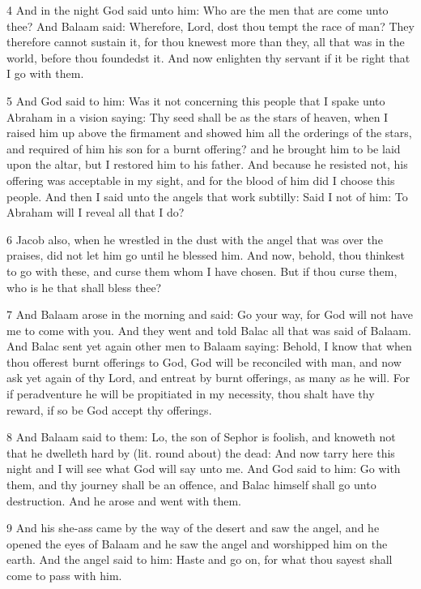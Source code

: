 \par 4 And in the night God said unto him: Who are the men that are come unto thee? And Balaam said: Wherefore, Lord, dost thou tempt the race of man? They therefore cannot sustain it, for thou knewest more than they, all that was in the world, before thou foundedst it. And now enlighten thy servant if it be right that I go with them. 

\par 5 And God said to him: Was it not concerning this people that I spake unto Abraham in a vision saying: Thy seed shall be as the stars of heaven, when I raised him up above the firmament and showed him all the orderings of the stars, and required of him his son for a burnt offering? and he brought him to be laid upon the altar, but I restored him to his father. And because he resisted not, his offering was acceptable in my sight, and for the blood of him did I choose this people. And then I said unto the angels that work subtilly: Said I not of him: To Abraham will I reveal all that I do?

\par 6 Jacob also, when he wrestled in the dust with the angel that was over the praises, did not let him go until he blessed him. And now, behold, thou thinkest to go with these, and curse them whom I have chosen. But if thou curse them, who is he that shall bless thee? 

\par 7 And Balaam arose in the morning and said: Go your way, for God will not have me to come with you. And they went and told Balac all that was said of Balaam. And Balac sent yet again other men to Balaam saying: Behold, I know that when thou offerest burnt offerings to God, God will be reconciled with man, and now ask yet again of thy Lord, and entreat by burnt offerings, as many as he will. For if peradventure he will be propitiated in my necessity, thou shalt have thy reward, if so be God accept thy offerings. 

\par 8 And Balaam said to them: Lo, the son of Sephor is foolish, and knoweth not that he dwelleth hard by (lit. round about) the dead: And now tarry here this night and I will see what God will say unto me. And God said to him: Go with them, and thy journey shall be an offence, and Balac himself shall go unto destruction. And he arose and went with them. 

\par 9 And his she-ass came by the way of the desert and saw the angel, and he opened the eyes of Balaam and he saw the angel and worshipped him on the earth. And the angel said to him: Haste and go on, for what thou sayest shall come to pass with him.

